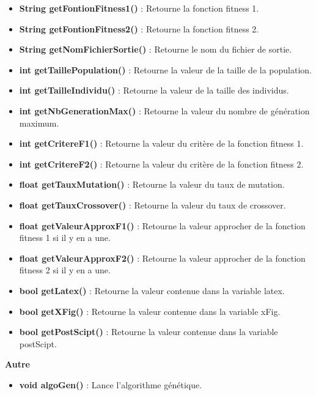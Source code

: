 \documentclass[a4paper,11pt]{article}
\begin{document}
				\begin{itemize}
					\item \textbf{String getFontionFitness1()} : Retourne la fonction fitness 1.
					\item \textbf{String getFontionFitness2()} : Retourne la fonction fitness 2.
					\item \textbf{String getNomFichierSortie()} : Retourne le nom du fichier de sortie.
					\item \textbf{int getTaillePopulation()} : Retourne la valeur de la taille de la population.
					\item \textbf{int getTailleIndividu()} : Retourne la valeur de la taille des individus.
					\item \textbf{int getNbGenerationMax()} : Retourne la valeur du nombre de génération maximum.
					\item \textbf{int getCritereF1()} : Retourne la valeur du critère de la fonction fitness 1.
					\item \textbf{int getCritereF2()} : Retourne la valeur du critère de la fonction fitness 2.
					\item \textbf{float getTauxMutation()} : Retourne la valeur du taux de mutation.
					\item \textbf{float getTauxCrossover()} : Retourne la valeur du taux de crossover.
					\item \textbf{float getValeurApproxF1()} : Retourne la valeur approcher de la fonction fitness 1 si il y en a une.
					\item \textbf{float getValeurApproxF2()} : Retourne la valeur approcher de la fonction fitness 2 si il y en a une.
					\item \textbf{bool getLatex()} : Retourne la valeur contenue dans la variable latex.
					\item \textbf{bool getXFig()} : Retourne la valeur contenue dans la variable  xFig.
					\item \textbf{bool getPostScipt()} : Retourne la valeur contenue dans la variable  postScipt.\\
				\end{itemize}
			\textbf{Autre}
				\begin{itemize}
					\item \textbf{void algoGen()} : Lance l'algorithme génétique.
				\end{itemize}
		
\end{document}
